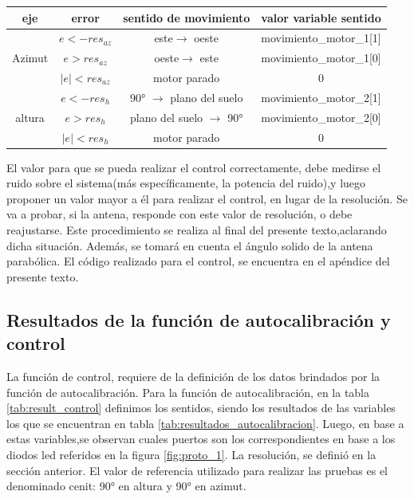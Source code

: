  \begin{table}[ht]
 	\centering 
 	\begin{tabular}{|c|c|c|c|}
 		\hline 
 		eje & error & sentido de movimiento & valor variable sentido \\ 
 		\hline	 
 		\multirow{3}{*}{Azimut}& $e<-res_{az}$ & este$\rightarrow$ oeste  &movimiento\_motor\_1[1] \\ \cline{2-4}
 		& $e>res_{az}$& oeste$\rightarrow$ este& movimiento\_motor\_1[0] \\ \cline{2-4}
 		& $|e|<res_{az}$& motor parado & 0\\ \cline{2-4}
 		\hline   
 		\multirow{3}{*}{altura}& $e<-res_h $ &90° $\rightarrow$ plano del suelo& movimiento\_motor\_2[1] \\ \cline{2-4}
 		& $e>res_h$ &plano del suelo $\rightarrow$ 90° & movimiento\_motor\_2[0] \\ \cline{2-4}
 		& $|e|<res_h$& motor parado& 0\\ 
 		\hline
 		  			
  	\end{tabular}
 \end{table}  
 
 El valor para que se pueda realizar el control correctamente, debe medirse el ruido sobre el sistema(más específicamente, la potencia del ruido),y luego proponer un valor mayor a él para realizar el control, en lugar de la resolución. Se va a probar, si la antena, responde con este valor de resolución, o debe reajustarse. Este procedimiento se realiza al final del presente texto,aclarando dicha situación. Además, se tomará en cuenta el ángulo solido de la antena parabólica. El código realizado para el control, se encuentra en el apéndice del presente texto. 

\subsection{Resultados de la función de autocalibración y control}

La función de control, requiere de la definición de los datos brindados por la función de autocalibración. Para la función de autocalibración, en la tabla \ref{tab:result_control} definimos los sentidos, siendo los resultados de las variables los que se encuentran en tabla \ref{tab:resultados_autocalibracion}. Luego, en base a estas variables,se observan cuales puertos son los correspondientes en base a los diodos led referidos en la figura \ref{fig:proto_1}. La resolución, se definió en la sección anterior. El valor de referencia utilizado para realizar las pruebas es el denominado cenit: 90° en altura y 90° en azimut. 

